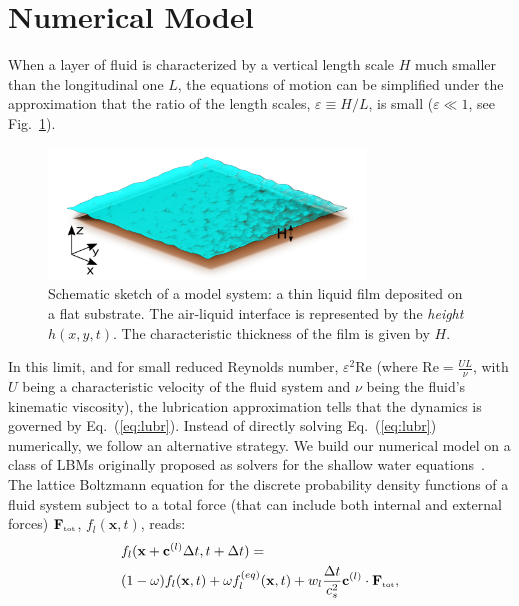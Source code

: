 \section{Numerical Model}\label{sec:method}

When a layer of fluid is characterized by a vertical length scale $H$ much smaller than the longitudinal one $L$, the equations of motion can be simplified under the approximation that the ratio of the length scales, $\varepsilon \equiv H/L$, is small ($\varepsilon \ll1$, see Fig.~\ref{fig:scheme}).
\begin{figure}
    \centering
    \includegraphics[width = 0.75\textwidth]{graphics/Fig_1_Scheme_V3_filters_2.png}
    \caption{Schematic sketch of a model system: a thin liquid film deposited on a flat substrate. The air-liquid interface is represented by the \textit{height} $h(x,y,t)$. The characteristic thickness of the film is given by $H$.}
    \label{fig:scheme}
\end{figure}
In this limit, and for small reduced Reynolds number, $\varepsilon^2\text{Re}$ (where $\text{Re} = \frac{UL}{\nu}$, with $U$ being a characteristic velocity of the fluid system and $\nu$ being the fluid's kinematic viscosity), the lubrication approximation tells that the dynamics is governed by Eq.~(\ref{eq:lubr}).
Instead of directly solving Eq.~(\ref{eq:lubr}) numerically, we follow an alternative strategy.
We build our numerical model on a class of LBMs originally proposed as solvers for the shallow water equations~\cite{salmonLatticeBoltzmannMethod1999,dellarNonhydrodynamicModesPriori2002,zhouLatticeBoltzmannMethods2004,vanthangStudy1DLattice2010}.
The lattice Boltzmann equation for the discrete probability density functions of a fluid system subject to a total force (that can include both internal and external forces) $\mathbf{F}_{\mbox{\tiny{tot}}}$, $f_l(\mathbf{x},t)$, reads:
\begin{equation}\label{eq:LBE}
\begin{split}
&f_l(\mathbf{x}+\mathbf{c}^{(l)}\Delta t,t+\Delta t) = \\
&(1 - \omega) f_l(\mathbf{x},t) + \omega f_l^{(eq)}(\mathbf{x},t) + w_l \frac{\Delta t}{c_s^2} \mathbf{c}^{(l)} \cdot \mathbf{F}_{\mbox{\tiny{tot}}},
\end{split}
\end{equation}
